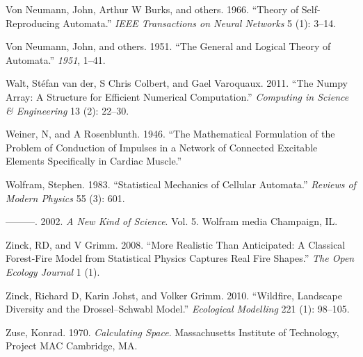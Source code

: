 \documentclass[
  openany]{book}
\newlength{\cslhangindent}
\newenvironment{cslreferences}%
  {\setlength{\parindent}{0pt}%
  \everypar{\setlength{\hangindent}{\cslhangindent}}\ignorespaces}%
  {\par}
\begin{document}
\begin{cslreferences}
\leavevmode\hypertarget{ref-von1966theory}{}%
Von Neumann, John, Arthur W Burks, and others. 1966. ``Theory of Self-Reproducing Automata.'' \emph{IEEE Transactions on Neural Networks} 5 (1): 3--14.

\leavevmode\hypertarget{ref-von1951general}{}%
Von Neumann, John, and others. 1951. ``The General and Logical Theory of Automata.'' \emph{1951}, 1--41.

\leavevmode\hypertarget{ref-walt2011numpy}{}%
Walt, Stéfan van der, S Chris Colbert, and Gael Varoquaux. 2011. ``The Numpy Array: A Structure for Efficient Numerical Computation.'' \emph{Computing in Science \& Engineering} 13 (2): 22--30.

\leavevmode\hypertarget{ref-weiner1946mathematical}{}%
Weiner, N, and A Rosenblunth. 1946. ``The Mathematical Formulation of the Problem of Conduction of Impulses in a Network of Connected Excitable Elements Specifically in Cardiac Muscle.''

\leavevmode\hypertarget{ref-wolfram1983statistical}{}%
Wolfram, Stephen. 1983. ``Statistical Mechanics of Cellular Automata.'' \emph{Reviews of Modern Physics} 55 (3): 601.

\leavevmode\hypertarget{ref-wolfram2002new}{}%
---------. 2002. \emph{A New Kind of Science}. Vol. 5. Wolfram media Champaign, IL.

\leavevmode\hypertarget{ref-zinck2008more}{}%
Zinck, RD, and V Grimm. 2008. ``More Realistic Than Anticipated: A Classical Forest-Fire Model from Statistical Physics Captures Real Fire Shapes.'' \emph{The Open Ecology Journal} 1 (1).

\leavevmode\hypertarget{ref-zinck2010wildfire}{}%
Zinck, Richard D, Karin Johst, and Volker Grimm. 2010. ``Wildfire, Landscape Diversity and the Drossel--Schwabl Model.'' \emph{Ecological Modelling} 221 (1): 98--105.

\leavevmode\hypertarget{ref-zuse1970calculating}{}%
Zuse, Konrad. 1970. \emph{Calculating Space}. Massachusetts Institute of Technology, Project MAC Cambridge, MA.
\end{cslreferences}
\end{document}
